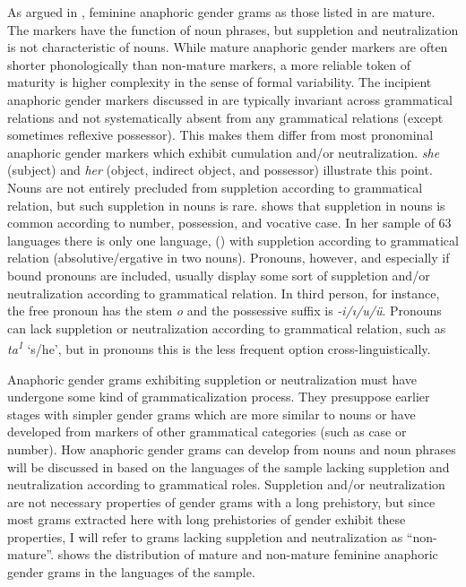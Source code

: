 \documentclass[output=collectionpaper]{langsci/langscibook}
\begin{document}
As argued in , feminine anaphoric gender grams as those listed in  are mature. The markers have the function of noun phrases, but suppletion and neutralization is not characteristic of nouns. While mature anaphoric gender markers are often shorter phonologically than non-mature markers, a more reliable token of maturity is higher complexity in the sense of formal variability. The incipient anaphoric gender markers discussed in  are typically invariant across grammatical relations and not systematically absent from any grammatical relations (except sometimes reflexive possessor). This makes them differ from most pronominal anaphoric gender markers which exhibit cumulation and/or neutralization.  \textit{she} (subject) and \textit{her} (object, indirect object, and possessor) illustrate this point. Nouns are not entirely precluded from suppletion according to grammatical relation, but such suppletion in nouns is rare. \citet{Vafaeian2013} shows that suppletion in nouns is common according to number, possession, and vocative case. In her sample of 63 languages there is only one language,  () with suppletion according to grammatical relation (absolutive/ergative in two nouns). Pronouns, however, and especially if bound pronouns are included, usually display some sort of suppletion and/or neutralization according to grammatical relation. In  third person, for instance, the free pronoun has the stem \textit{o} and the possessive suffix is \textit{-i/ı/u/ü}. Pronouns can lack suppletion or neutralization according to grammatical relation, such as   \textit{ta\textsuperscript{1}} ‘s/he’, but in pronouns this is the less frequent option cross-linguistically.

Anaphoric gender grams exhibiting suppletion or neutralization must have undergone some kind of grammaticalization process. They presuppose earlier stages with simpler gender grams which are more similar to nouns or have developed from markers of other grammatical categories (such as case or number). How anaphoric gender grams can develop from nouns and noun phrases will be discussed in  based on the languages of the sample lacking suppletion and neutralization according to grammatical roles. Suppletion and/or neutralization are not necessary properties of gender grams with a long prehistory, but since most grams extracted here with long prehistories of gender exhibit these properties, I will refer to grams lacking suppletion and neutralization as “non-mature”.  shows the distribution of mature and non-mature feminine anaphoric gender grams in the languages of the sample.
\end{document}
